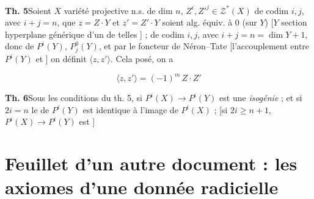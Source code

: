 \documentclass[11pt,a4paper]{article}
\begin{document}




\textbf{Th. 5}\quad Soient $X$ variété projective n.s. de dim $n$, $Z^{i},
Z'^{j} \in \mathcal{Z}^{*}(X)$ de codim $i, j$, avec  $i+j = n$,
\ill{} que $z = Z\cdot Y$ et $z' = Z'\cdot Y$ soient alg. équiv. à $0$ (sur $Y$)
[$Y$ section hyperplane générique d'un  de telles \ill{}] ;
de codim \struck{\ill{}} $i, j$, avec  $i+j = n =
\dim Y + 1$, donc  \ill{} de $P^{i}(Y)$,
$P^{0}_{j}(Y)$, et par le foncteur de Néron--Tate \ill{} [l'accouplement entre
$P^{i}(Y)$ et ] on \struck{\ill{}} définit $\langle z,
z'\rangle$. Cela posé, on a 

\[
  \langle z, z'\rangle = (-1)^{m}\, Z\cdot Z'
\]






\textbf{Th. 6}\quad Sous les conditions du th. 5, si 
$P^{i}(X) \to P^{i}(Y)$ est une \emph{isogénie} ; et si $2i = n$ le \ill{} de
$P^{i}(Y)$ est identique à l'image de $P^{i}(X)$ ;    [si  $2i \geq n+1$, $P^{i}(X) \to P^{i}(Y)$
est \ill{}] 


\section*{Feuillet d'un autre document : les axiomes d'une donnée radicielle}
\end{document}
